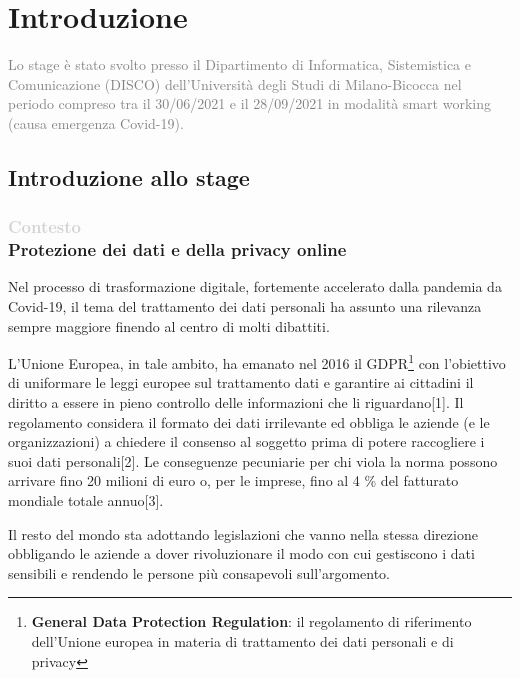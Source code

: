\chapter*{Introduzione}

\rhead{}

\textcolor{gray}{Lo stage è stato svolto presso il Dipartimento di Informatica, Sistemistica e Comunicazione (DISCO) dell'Università degli Studi di Milano-Bicocca nel periodo compreso tra il 30/06/2021 e il 28/09/2021 in modalità smart working (causa emergenza Covid-19).}

\section*{Introduzione allo stage}

\subsection*{\textcolor{lightgray}{\normalsize{Contesto}} \\ Protezione dei dati e della privacy online}
Nel processo di trasformazione digitale, fortemente accelerato dalla pandemia da Covid-19, il tema del trattamento dei dati personali ha assunto una rilevanza sempre maggiore finendo al centro di molti dibattiti.

L'Unione Europea, in tale ambito, ha emanato nel 2016 il GDPR\footnote{\textbf{General Data Protection Regulation}: il regolamento di riferimento dell'Unione europea in materia di trattamento dei dati personali e di privacy} con l'obiettivo di uniformare le leggi europee sul trattamento dati e garantire ai cittadini il diritto a essere in pieno controllo delle informazioni che li riguardano[1]. Il regolamento considera il formato dei dati irrilevante ed obbliga le aziende (e le organizzazioni) a chiedere il consenso al soggetto prima di potere raccogliere i suoi dati personali[2]. Le conseguenze pecuniarie per chi viola la norma possono arrivare fino 20 milioni di euro o, per le imprese, fino al 4 \% del fatturato mondiale totale annuo[3].

Il resto del mondo sta adottando legislazioni che vanno nella stessa direzione obbligando le aziende a dover rivoluzionare il modo con cui gestiscono i dati sensibili e rendendo le persone più consapevoli sull'argomento.

